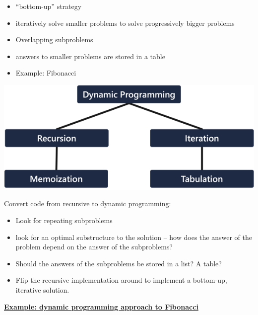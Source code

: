 \begin{itemize}
    \item “bottom-up” strategy
    \item iteratively solve smaller problems to solve progressively bigger problems
    \item Overlapping subproblems
    \item answers to smaller problems are stored in a table
    \item Example: Fibonacci
\end{itemize}

\includegraphics[width = \linewidth]{src/8_dp/images/dp.png}

Convert code from recursive to dynamic programming:
\begin{itemize}
    \item Look for repeating subproblems
    \item look for an optimal substructure to the solution – how does the answer of the problem depend on the answer of the subproblems?
    \item Should the answers of the subproblems be stored in a list? A table?
    \item Flip the recursive implementation around to implement a bottom-up, iterative solution.
\end{itemize}

{\centering \underline{\textbf{Example: dynamic programming approach to Fibonacci}} \par}

